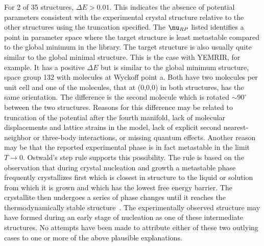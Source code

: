\documentclass[preprint]{iucr}              %
\newcommand{\mb}[1]{\ensuremath{\mbox{\boldmath $ #1 $}}}
\begin{document}
For 2 of 35 structures, $\Delta E > 0.01$.  This indicates the
absence of potential parameters consistent with the experimental
crystal structure relative to the other structures using the
truncation specified.  The $\mb{\nu}_{RP}$ listed identifies a point
in parameter space where the target structure is least metastable
compared to the global minimum in the library.  The target structure
is also usually quite similar to the global minimal structure. This
is the case with YEMRIR, for example. It has a positive $\Delta E$
but is similar to the global minimum structure, space group 132 with
molecules at Wyckoff point a. Both have two molecules per unit cell
and one of the molecules, that at (0,0,0) in both structures, has
the same orientation.  The difference is the second molecule which
is rotated $\sim 90^\circ$ between the two structures. Reasons for
this difference may be related to truncation of the potential after
the fourth manifold, lack of molecular displacements and lattice
strains in the model, lack of explicit second nearest-neighbor or
three-body interactions, or missing quantum effects.  Another reason
may be that the reported experimental phase is in fact metastable in
the limit $T\rightarrow 0$. Ostwald's step rule supports this possibility.  The
rule is based on the observation that during crystal nucleation and growth a
metastable phase
frequently crystallizes first which is closest in structure to the liquid or
solution from which it is grown and which has the lowest free energy barrier.
The crystallite then
undergoes a series of phase changes until it reaches the
thermodynamically stable structure~\cite{Schmalzried03}. The
experimentally observed structure may have formed during an early
stage of nucleation as one of these intermediate structures.  No attempts have
been made to attribute either of these two outlying cases to one or more of the
above plausible explanations.
\end{document}
